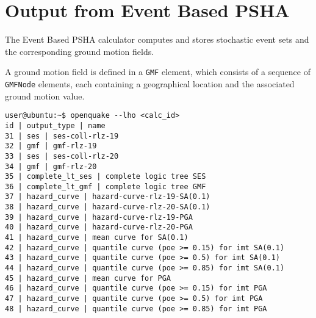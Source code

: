 \section{Output from Event Based PSHA}\label{EventBasedOutput}
%
The Event Based PSHA calculator computes and stores stochastic 
event sets and the corresponding ground motion fields. 

A ground motion field is defined in a \Verb+GMF+ element, which 
consists of a sequence of \Verb+GMFNode+ elements, 
each containing a geographical location and the associated ground 
motion value.
\begin{Verbatim}[frame=single, commandchars=\\\{\}, samepage=true]
user@ubuntu:~$ openquake --lho <calc_id> 
id | output_type | name
31 | ses | ses-coll-rlz-19
32 | gmf | gmf-rlz-19
33 | ses | ses-coll-rlz-20
34 | gmf | gmf-rlz-20
35 | complete_lt_ses | complete logic tree SES
36 | complete_lt_gmf | complete logic tree GMF
37 | hazard_curve | hazard-curve-rlz-19-SA(0.1)
38 | hazard_curve | hazard-curve-rlz-20-SA(0.1)
39 | hazard_curve | hazard-curve-rlz-19-PGA
40 | hazard_curve | hazard-curve-rlz-20-PGA
41 | hazard_curve | mean curve for SA(0.1)
42 | hazard_curve | quantile curve (poe >= 0.15) for imt SA(0.1)
43 | hazard_curve | quantile curve (poe >= 0.5) for imt SA(0.1)
44 | hazard_curve | quantile curve (poe >= 0.85) for imt SA(0.1)
45 | hazard_curve | mean curve for PGA
46 | hazard_curve | quantile curve (poe >= 0.15) for imt PGA
47 | hazard_curve | quantile curve (poe >= 0.5) for imt PGA
48 | hazard_curve | quantile curve (poe >= 0.85) for imt PGA
\end{Verbatim}

